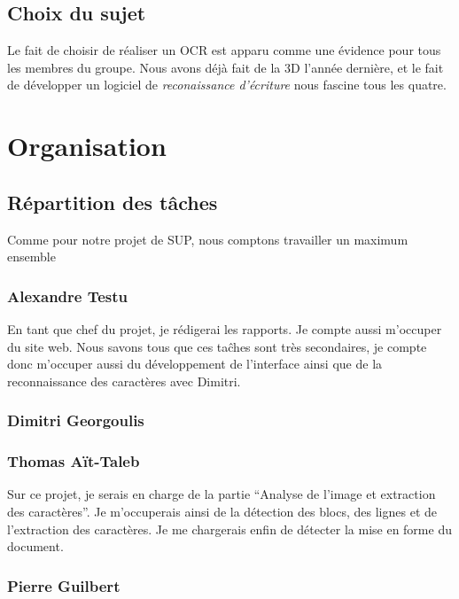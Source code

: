 \documentclass[]{report}
\begin{document}
	\section{Choix du sujet} %
	\label{sec:choix_du_sujet}
		Le fait de choisir de r\'ealiser un OCR est apparu comme une \'evidence pour tous les membres du groupe. Nous avons d\'ej\`a fait de la 3D l'ann\'ee derni\`ere, et le fait de d\'evelopper un logiciel de \emph{reconaissance d'\'ecriture} nous fascine tous les quatre.

\chapter{Organisation} %
\label{cha:organisation}
	\section{R\'epartition des t\^aches} %
	\label{sec:r'epartition_des_t^aches}
		Comme pour notre projet de SUP, nous comptons travailler un maximum ensemble
		\subsection{Alexandre Testu} %
		\label{sub:alexandre_testu}
			En tant que chef du projet, je r\'edigerai les rapports. Je compte aussi m'occuper du site web. Nous savons tous que ces ta\^ches sont tr\`es secondaires, je compte donc m'occuper aussi du d\'eveloppement de l'interface ainsi que de la reconnaissance des caract\`eres avec Dimitri.
		\subsection{Dimitri Georgoulis} %
		\label{sub:dimitri_georgoulis}
		
		\subsection{Thomas A\"it-Taleb} %
		\label{sub:thomas_a"it_taleb}
      Sur ce projet, je serais en charge de la partie ``Analyse de l'image et extraction des caractères''. Je m'occuperais ainsi de la détection des blocs, des lignes et de l'extraction des caractères. Je me chargerais enfin de détecter la mise en forme du document.
		\subsection{Pierre Guilbert} %
		\label{sub:pierre_guilbert}
		
\end{document}

